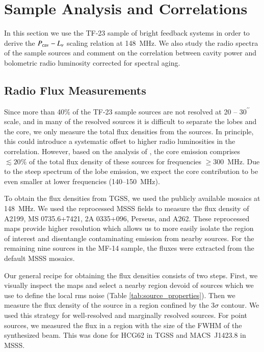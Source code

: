 \documentclass{aa}  %
\begin{document}
\section{Sample Analysis and Correlations}
\label{analysis_and_correlations}

In this section we use the TF-23 sample of bright feedback systems in order to derive the  $P_{\rm cav} - L_\nu$ scaling relation at 148~MHz.
We also study the radio spectra of the sample sources and comment on the correlation between cavity power and bolometric radio luminosity corrected for spectral aging.

\subsection{Radio Flux Measurements}

Since more than 40\% of the TF-23 sample sources are not resolved at 20 -- $30^{\prime\prime}$ scale, and in many of the resolved sources it is difficult to separate the lobes and the core, we only measure the total flux densities from the sources.
In principle, this could introduce a systematic offset to higher radio luminosities in the correlation.
However, based on the analysis of \cite{Birzan2008}, the core emission comprises $\lesssim20\%$ of the total flux density of these sources for frequencies $\geq 300$~MHz.
Due to the steep spectrum of the lobe emission, we expect the core contribution to be even smaller at lower frequencies (140--150~MHz).

To obtain the flux densities from TGSS, we used the publicly available mosaics at 148~MHz.
We used the reprocessed MSSS fields to measure the flux density of A2199, MS 0735.6+7421, 2A 0335+096, Perseus, and A262. 
These reprocessed maps provide higher resolution which allows us to more easily isolate the region of interest and disentangle contaminating emission from nearby sources. 
For the remaining nine sources in the MF-14 sample, the fluxes were extracted from the default MSSS mosaics.


Our general recipe for obtaining the flux densities consists of two steps.
First, we visually inspect the maps and select a nearby region devoid of sources which we use to define the local rms noise (Table \ref{tab:source_properties}).
Then we measure the flux density of the source in a region confined by the 3$\sigma$ contour. 
We used this strategy for well-resolved and marginally resolved sources. 
For point sources, we measured the flux in a region with the size of the FWHM of the synthesized beam.
This was done for HCG62 in TGSS and MACS~J1423.8 in MSSS.
\end{document}
